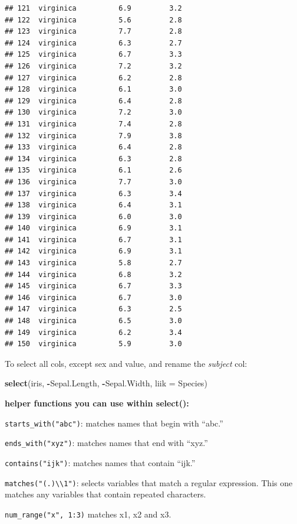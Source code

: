 \documentclass[]{book}
\newenvironment{Shaded}{\begin{snugshade}}{\end{snugshade}}
\newcommand{\KeywordTok}[1]{\textcolor[rgb]{0.13,0.29,0.53}{\textbf{#1}}}
\newcommand{\DataTypeTok}[1]{\textcolor[rgb]{0.13,0.29,0.53}{#1}}
\newcommand{\OperatorTok}[1]{\textcolor[rgb]{0.81,0.36,0.00}{\textbf{#1}}}
\newcommand{\NormalTok}[1]{#1}
\begin{document}
\begin{verbatim}
## 121  virginica          6.9         3.2
## 122  virginica          5.6         2.8
## 123  virginica          7.7         2.8
## 124  virginica          6.3         2.7
## 125  virginica          6.7         3.3
## 126  virginica          7.2         3.2
## 127  virginica          6.2         2.8
## 128  virginica          6.1         3.0
## 129  virginica          6.4         2.8
## 130  virginica          7.2         3.0
## 131  virginica          7.4         2.8
## 132  virginica          7.9         3.8
## 133  virginica          6.4         2.8
## 134  virginica          6.3         2.8
## 135  virginica          6.1         2.6
## 136  virginica          7.7         3.0
## 137  virginica          6.3         3.4
## 138  virginica          6.4         3.1
## 139  virginica          6.0         3.0
## 140  virginica          6.9         3.1
## 141  virginica          6.7         3.1
## 142  virginica          6.9         3.1
## 143  virginica          5.8         2.7
## 144  virginica          6.8         3.2
## 145  virginica          6.7         3.3
## 146  virginica          6.7         3.0
## 147  virginica          6.3         2.5
## 148  virginica          6.5         3.0
## 149  virginica          6.2         3.4
## 150  virginica          5.9         3.0
\end{verbatim}

To select all cols, except sex and value, and rename the \emph{subject}
col:

\begin{Shaded}
\begin{Highlighting}[]
\KeywordTok{select}\NormalTok{(iris, }\OperatorTok{-}\NormalTok{Sepal.Length, }\OperatorTok{-}\NormalTok{Sepal.Width, }\DataTypeTok{liik =}\NormalTok{ Species)}
\end{Highlighting}
\end{Shaded}

\textbf{helper functions you can use within select():}

\texttt{starts\_with("abc")}: matches names that begin with ``abc.''

\texttt{ends\_with("xyz")}: matches names that end with ``xyz.''

\texttt{contains("ijk")}: matches names that contain ``ijk.''

\texttt{matches("(.)\textbackslash{}\textbackslash{}1")}: selects
variables that match a regular expression. This one matches any
variables that contain repeated characters.

\texttt{num\_range("x",\ 1:3)} matches x1, x2 and x3.
\end{document}
